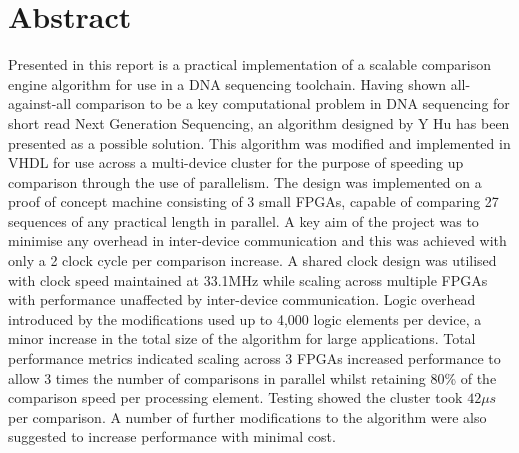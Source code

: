 
\renewcommand{\baselinestretch}{1.5}
\chapter{Abstract}
\renewcommand{\baselinestretch}{\mystretch}


Presented in this report is a practical implementation of a scalable comparison engine algorithm for use in a DNA sequencing toolchain. Having shown all-against-all comparison to be a key computational problem in DNA sequencing for short read Next Generation Sequencing, an algorithm designed by Y Hu has been presented as a possible solution. This algorithm was modified and implemented in VHDL for use across a multi-device cluster for the purpose of speeding up comparison through the use of parallelism. The design was implemented on a proof of concept machine consisting of 3 small FPGAs, capable of comparing 27 sequences of any practical length in parallel. A key aim of the project was to minimise any overhead in inter-device communication and this was achieved with only a 2 clock cycle per comparison  increase. A shared clock design was utilised with clock speed maintained at 33.1MHz while scaling across multiple FPGAs with performance unaffected by inter-device communication. Logic overhead introduced by the modifications used up to 4,000 logic elements per device, a minor increase in the total size of the algorithm for large applications. Total performance metrics indicated scaling across 3 FPGAs increased performance to allow 3 times the number of comparisons in parallel whilst retaining 80\% of the comparison speed per processing element. Testing showed the cluster took $42{\mu}s$ per comparison.  A number of further modifications to the algorithm were also suggested to increase performance with minimal cost.
